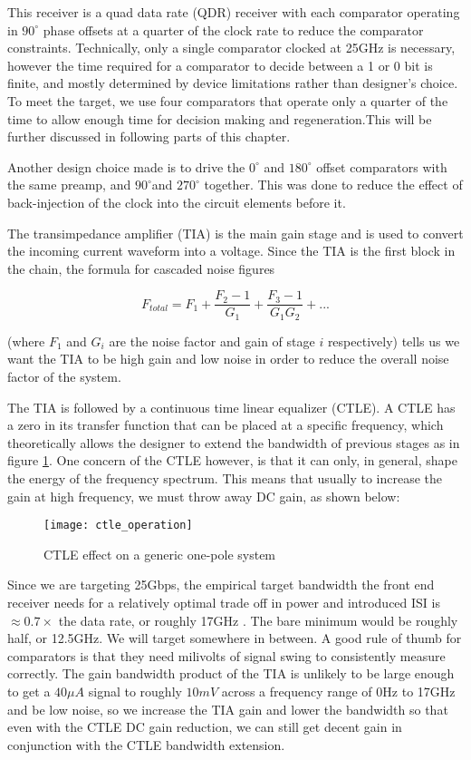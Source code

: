 This receiver is a quad data rate (QDR) receiver with each comparator operating in $90^\circ$ phase offsets at a quarter of the clock rate to reduce the comparator constraints. Technically, only a single comparator clocked at 25GHz is necessary, however the time required for a comparator to decide between a 1 or 0 bit is finite, and mostly determined by device limitations rather than designer's choice. To meet the target, we use four comparators that operate only a quarter of the time to allow enough time for decision making and regeneration.This will be further discussed in following parts of this chapter.

Another design choice made is to drive the $0^\circ$ and $180^\circ$ offset comparators with the same preamp, and $90^\circ$and $270^\circ$ together. This was done to reduce the effect of back-injection of the clock into the circuit elements before it.

The transimpedance amplifier (TIA) is the main gain stage and is used to convert the incoming current waveform into a voltage. Since the TIA is the first block in the chain, the formula for cascaded noise figures

\begin{equation}
\label{friis}
F_{total}=F_1+\frac{F_2-1}{G_1}+\frac{F_3-1}{G_1G_2}+...
\end{equation}

(where $F_1$ and $G_i$ are the noise factor and gain of stage $i$ respectively) tells us we want the TIA to be high gain and low noise in order to reduce the overall noise factor of the system.

The TIA is followed by a continuous time linear equalizer (CTLE). A CTLE has a zero in its transfer function that can be placed at a specific frequency, which theoretically allows the designer to extend the bandwidth of previous stages as in figure \ref{fig:CTLE Operation}. One concern of the CTLE however, is that it can only, in general, shape the energy of the frequency spectrum. This means that usually to increase the gain at high frequency, we must throw away DC gain, as shown below:

\begin{figure}[h]
\centering
\texttt{[image: ctle\_operation]}
\caption{CTLE effect on a generic one-pole system}
\label{fig:CTLE Operation}
\end{figure}

Since we are targeting 25Gbps, the empirical target bandwidth the front end receiver needs for a relatively optimal trade off in power and introduced ISI is $\approx 0.7\times$ the data rate, or roughly 17GHz \cite{settaluri_first_2017}. The bare minimum would be roughly half, or 12.5GHz. We will target somewhere in between. A good rule of thumb for comparators is that they need milivolts of signal swing to consistently measure correctly. The gain bandwidth product of the TIA is unlikely to be large enough to get a $40\mu A$ signal to roughly $10mV$ across a frequency range of 0Hz to 17GHz and be low noise, so we increase the TIA gain and lower the bandwidth so that even with the CTLE DC gain reduction, we can still get decent gain in conjunction with the CTLE bandwidth extension. 

